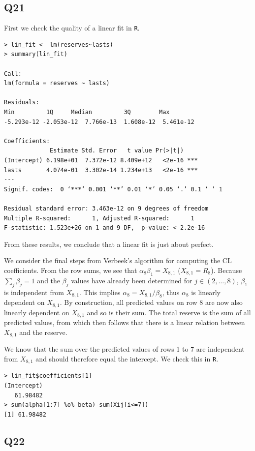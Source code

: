\documentclass[11pt]{article}
\begin{document}
\subsection*{Q21}

First we check the quality of a linear fit in \verb|R|.

\begin{verbatim}
> lin_fit <- lm(reserves~lasts)
> summary(lin_fit)

Call:
lm(formula = reserves ~ lasts)

Residuals:
Min         1Q     Median         3Q        Max 
-5.293e-12 -2.053e-12  7.766e-13  1.608e-12  5.461e-12 

Coefficients:
             Estimate Std. Error   t value Pr(>|t|)    
(Intercept) 6.198e+01  7.372e-12 8.409e+12   <2e-16 ***
lasts       4.074e-01  3.302e-14 1.234e+13   <2e-16 ***
---
Signif. codes:  0 ‘***’ 0.001 ‘**’ 0.01 ‘*’ 0.05 ‘.’ 0.1 ‘ ’ 1

Residual standard error: 3.463e-12 on 9 degrees of freedom
Multiple R-squared:      1,	Adjusted R-squared:      1 
F-statistic: 1.523e+26 on 1 and 9 DF,  p-value: < 2.2e-16
\end{verbatim}

From these results, we conclude that a linear fit is just about perfect.

We consider the final steps from Verbeek's algorithm for computing the CL coefficients. From the row sums, we see that $\alpha_{8}\beta_{1} = X_{8,1}$ ($X_{8,1} = R_{8}$). Because $\sum_{j} \beta_{j} = 1$ and the $\beta_{j}$ values have already been determined for $j \in (2, \ldots, 8)$, $\beta_{1}$ is independent from $X_{8,1}$. This implies $\alpha_{8} = X_{8,1}/\beta_{8}$, thus $\alpha_{8}$ is linearly dependent on $X_{8,1}$. By construction, all predicted values on row 8 are now also linearly dependent on $X_{8,1}$ and so is their sum. The total reserve is the sum of all predicted values, from which then follows that there is a linear relation between $X_{8,1}$ and the reserve.

We know that the sum over the predicted values of rows 1 to 7 are independent from $X_{8,1}$ and should therefore equal the intercept. We check this in \verb|R|.

\begin{verbatim}
> lin_fit$coefficients[1]
(Intercept) 
   61.98482 
> sum(alpha[1:7] %o% beta)-sum(Xij[i<=7])
[1] 61.98482
\end{verbatim}


\subsection*{Q22}
\end{document}
